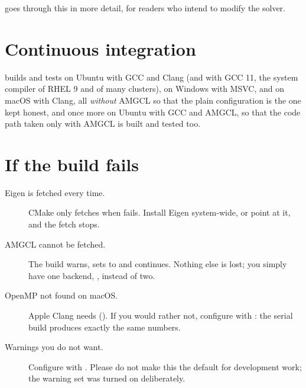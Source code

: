  goes through this in more detail, for readers who intend to
modify the solver.

\section{Continuous integration}
\label{sec:install:ci}

 builds and tests on Ubuntu with GCC and Clang
(and with GCC 11, the system compiler of RHEL 9 and of many clusters),
on Windows with MSVC, and on macOS with Clang, all \emph{without} AMGCL so
that the plain configuration is the one kept honest, and once more on Ubuntu
with GCC and AMGCL, so that the code path taken only with AMGCL is built and
tested too.

\section{If the build fails}
\label{sec:install:trouble}

\begin{description}
  \item[Eigen is fetched every time.] CMake only fetches when
     fails. Install Eigen
    system-wide, or point  at it, and the fetch stops.
  \item[AMGCL cannot be fetched.] The build warns, sets
     to  and continues. Nothing else is lost;
    you simply have one backend, , instead of two.
  \item[OpenMP not found on macOS.] Apple Clang needs 
    (). If you would rather not, configure with
    : the serial build produces exactly the
    same numbers.
  \item[Warnings you do not want.] Configure with
    . Please do not make this the default
    for development work; the warning set was turned on deliberately.
\end{description}
